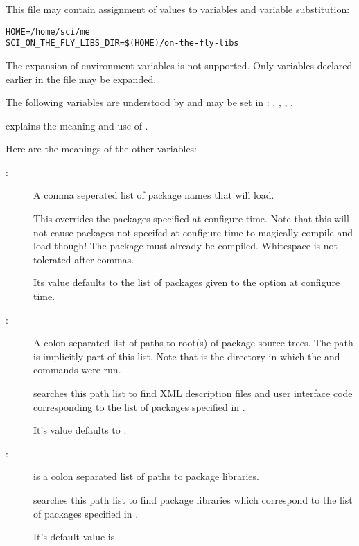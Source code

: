 This file may contain assignment of values to variables and variable
substitution:

\begin{verbatim}
HOME=/home/sci/me
SCI_ON_THE_FLY_LIBS_DIR=$(HOME)/on-the-fly-libs
\end{verbatim}

The expansion of environment variables is not supported.  Only
variables declared earlier in the file may be expanded.

The following variables are understood by \sr{} and may be set in
: ,
, ,
.

 explains the meaning and use
of .

Here are the meanings of the other variables:

\begin{description}
  \item[\mbox{}: ]\mbox{} 
    
    A comma seperated list of package names that \sr{} will load.
    
    This overrides the packages specified at configure time.  Note
    that this will not cause packages not specifed at configure time
    to magically compile and load though!  The package must already be
    compiled.  Whitespace is not tolerated after commas.
    
    Its value defaults to the list of packages given to the
     option at configure time.
    
  \item[\mbox{}: ]\mbox{} 
    
    A colon separated list of paths to root(s) of package source
    trees.  The path  is implicitly part of
    this list.  Note that  is the directory in which
    the  and  commands were run.
   
    \sr{} searches this path list to find XML description files and
    user interface code corresponding to the list of packages
    specified in .
    
    It's value defaults to .

  \item[\mbox{}: ]\mbox{} 
    
     is a colon separated list of paths to
    package libraries.
    
    \sr{} searches this path list to find package libraries
    which correspond to the list of packages specified in
    .
    
    It's default value is .

\end{description}

